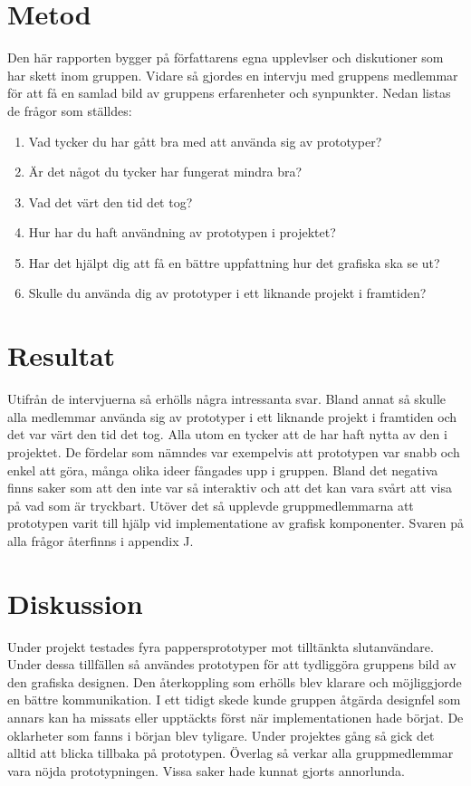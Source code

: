 \section{Metod}
Den här rapporten bygger på författarens egna upplevlser och diskutioner som har skett inom gruppen. Vidare så gjordes en intervju med gruppens medlemmar för att få en samlad bild av gruppens erfarenheter och synpunkter. Nedan listas de frågor som ställdes:
\begin{enumerate}
	\item Vad tycker du har gått bra med att använda sig av prototyper?
 	\item Är det något du tycker har fungerat mindra bra?
 	\item Vad det värt den tid det tog?
 	\item Hur har du haft användning av prototypen i projektet?
 	\item Har det hjälpt dig att få en bättre uppfattning hur det grafiska ska se ut?
 	\item Skulle du använda dig av prototyper i ett liknande projekt i framtiden? 
\end{enumerate}
 
\section{Resultat}
Utifrån de intervjuerna så erhölls några intressanta svar. Bland annat så skulle alla medlemmar använda sig av prototyper i ett liknande projekt i framtiden och det var värt den tid det tog. Alla utom en tycker att de har haft nytta av den i projektet. De fördelar som nämndes var exempelvis att prototypen var snabb och enkel att göra, många olika ideer fångades upp i gruppen. Bland det negativa finns saker som att den inte var så interaktiv och att det kan vara svårt att visa på vad som är tryckbart. Utöver det så upplevde gruppmedlemmarna att prototypen varit till hjälp vid implementatione av grafisk komponenter. Svaren på alla frågor återfinns i appendix J.  
  
\section{Diskussion}
Under projekt testades fyra pappersprototyper mot tilltänkta slutanvändare. Under dessa tillfällen så användes prototypen för att tydliggöra gruppens bild av den grafiska designen. Den återkoppling som erhölls blev klarare och möjliggjorde en bättre kommunikation. I ett tidigt skede kunde gruppen åtgärda designfel som annars kan ha missats eller upptäckts först när implementationen hade börjat. De oklarheter som fanns i början blev tyligare. Under projektes gång så gick det alltid att blicka tillbaka på prototypen.
Överlag så verkar alla gruppmedlemmar vara nöjda prototypningen. Vissa saker hade kunnat gjorts annorlunda.  

